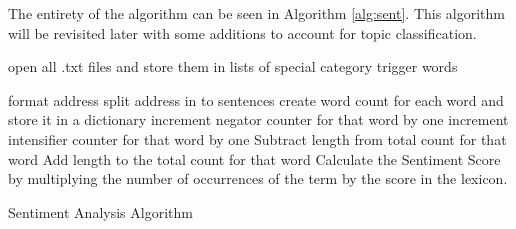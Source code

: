 The entirety of the algorithm can be seen in Algorithm \ref{alg:sent}.
This algorithm will be revisited later with some additions to account for topic classification.

\begin{singlespace}
\begin{algorithm}[H]
\DontPrintSemicolon
{}
\BlankLine
open all .txt files and store them in lists of special category trigger words\;
	{format address\;
	split address in to sentences\;
		{create word count for each word and store it in a dictionary\;
				{increment negator counter for that word by one}
				{increment intensifier counter for that word by one}
			}
		{
		{
		{Subtract length from total count for that word}
		}
		{Add length to the total count for that word}
		Calculate the Sentiment Score by multiplying the number of occurrences of the term by the score in the lexicon.
		}
		
	}
	
\caption{Sentiment Analysis Algorithm}
\label{alg:sent}
\end{algorithm}
\end{singlespace}

